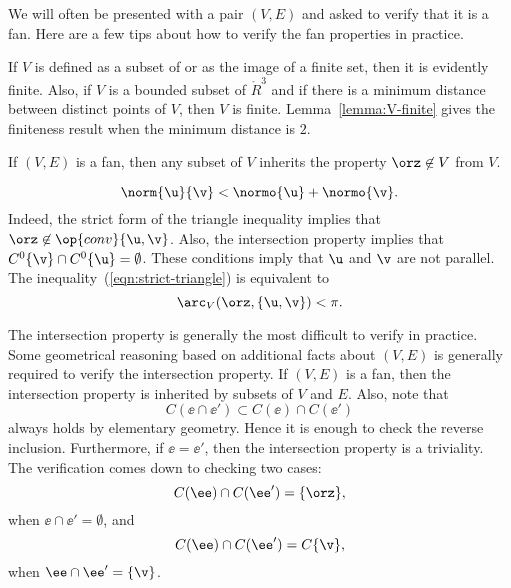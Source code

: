 \begin{remark}\label{remark:fan-verify}  
We will often be presented with a pair $(V,E)$ and asked to verify
that it is a fan.  Here are a few tips about how to verify the fan
properties in practice.
\begin{description} 
\item {} If $V$ is defined as a subset of or as the image of a
finite set, then it is evidently finite.  Also, if $V$ is a bounded
subset of $\ring{R}^3$ and if there is a minimum distance between
distinct points of $V$, then $V$ is finite.
Lemma~\ref{lemma:V-finite} gives the finiteness result when the
minimum distance is $2$.\vspace{6pt}
\item {} If $(V,E)$ is a fan, then any subset of $V$
inherits the property $\orz\not\in V$ from $V$.  \vspace{6pt}
\item {} 
\begin{equation}\label{eqn:strict-triangle}
\norm{\u}{\v} < \normo{\u} + \normo{\v}.
\end{equation}
Indeed, the strict form of the triangle inequality implies that
$\orz\not\in \op{conv}\{\u,\v\}$.  Also, the intersection property
implies that $C^0\{\v\} \cap C^0\{\u\} = \emptyset$.  These conditions
imply that $\u$ and $\v$ are not parallel.  The inequality~(\ref{eqn:strict-triangle})
is equivalent to
\begin{displaymath}
\arc_V(\orz,\{\u,\v\}) < \pi.
\end{displaymath}
\item {} The intersection property is generally the
most difficult to verify in practice.  Some geometrical reasoning
based on additional facts about $(V,E)$ is generally required to
verify the intersection property.  If $(V,E)$ is a fan, then the
intersection property is inherited by subsets of $V$ and $E$.  Also,
note that
\begin{displaymath}
C(\ee\cap \ee') \subset C(\ee) \cap C(\ee')
\end{displaymath}
always holds by elementary geometry.  Hence it is enough to check the
reverse inclusion.  Furthermore, if $\ee = \ee'$, then the
intersection property is a triviality.  The verification comes down to
checking two cases:
\begin{displaymath}
C(\ee) \cap C(\ee') = \{\orz\},
\end{displaymath}
when $\ee\cap \ee' = \emptyset$, and
\begin{displaymath}
C(\ee)\cap C(\ee') = C\{\v\},
\end{displaymath}
when $\ee\cap \ee' = \{\v\}$.
\end{description}
\end{remark}


